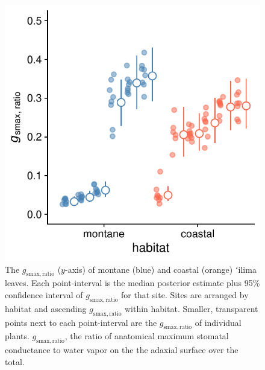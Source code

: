 \documentclass[
  letterpaper,
  DIV=11,
  numbers=noendperiod]{scrartcl}
\begin{document}
\newpage

\begin{figure}
  \includegraphics{../figures/habitat-gmaxratio.pdf}
  \caption{The $g_\mathrm{smax,ratio}$ ($y$-axis) of montane (blue) and coastal (orange) ʻilima leaves. Each point-interval is the median posterior estimate plus 95\% confidence interval of $g_\mathrm{smax,ratio}$ for that site. Sites are arranged by habitat and ascending $g_\mathrm{smax,ratio}$ within habitat. Smaller, transparent points next to each point-interval are the $g_\mathrm{smax,ratio}$ of individual plants. $g_\mathrm{smax,ratio}$, the ratio of anatomical maximum stomatal conductance to water vapor on the the adaxial surface over the total.}
  \label{fig:habitat-gmaxratio}
\end{figure}
\end{document}

